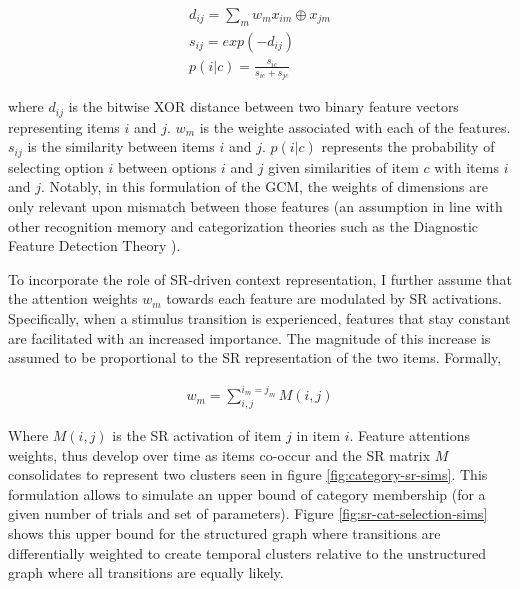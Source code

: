 \begin{equation}
    \begin{aligned}
        d_{ij} = \sum_{m} w_m x_{im} \oplus x_{jm} \\
        s_{ij} = exp(-d_{ij}) \\ 
        p(i|c) = \frac{s_{ic}}{s_{ic} + s_{jc}} 
    \end{aligned}
\end{equation}

where $d_{ij}$ is the bitwise XOR distance between two binary feature vectors representing items $i$ and $j$. $w_m$ is the weighte associated with each of the features. $s_{ij}$ is the similarity between items $i$ and $j$. $p(i|c)$ represents the probability of selecting option $i$ between options $i$ and $j$ given similarities of item $c$ with items $i$ and $j$. Notably, in this formulation of the GCM, the weights of dimensions are only relevant upon mismatch between those features (an assumption in line with other recognition memory and categorization theories such as the Diagnostic Feature Detection Theory \cite{wixted2014signal}).

To incorporate the role of SR-driven context representation, I further assume that the attention weights $w_m$ towards each feature are modulated by SR activations. Specifically, when a stimulus transition is experienced, features that stay constant are facilitated with an increased importance. The magnitude of this increase is assumed to be proportional to the SR representation of the two items. Formally, 

\begin{equation}
    \begin{aligned}
        w_m = \sum_{i, j}^{i_m = j_m} M(i, j)
    \end{aligned}
\end{equation}

Where $M(i, j)$ is the SR activation of item $j$ in item $i$. Feature attentions weights, thus develop over time as items co-occur and the SR matrix $M$ consolidates to represent two clusters seen in figure \ref{fig:category-sr-sims}. This formulation allows to simulate an upper bound of category membership (for a given number of trials and set of parameters). Figure \ref{fig:sr-cat-selection-sims} shows this upper bound for the structured graph where transitions are differentially weighted to create temporal clusters relative to the unstructured graph where all transitions are equally likely. 

